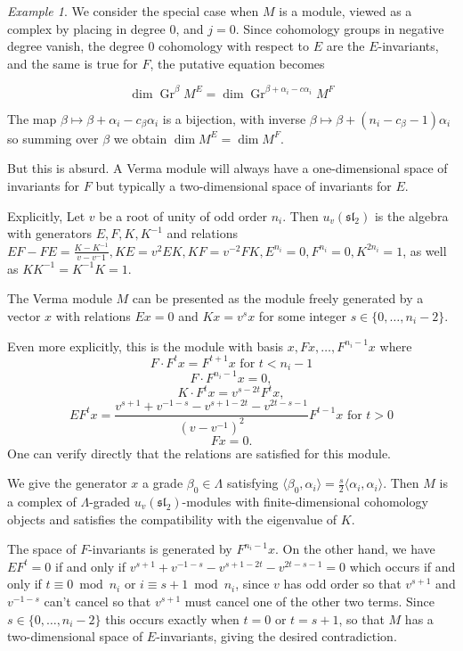 \documentclass[11pt,letterpaper]{article}
\theoremstyle{definition}
\theoremstyle{remark}
\newtheorem{example}[theorem]{Example}
\numberwithin{equation}{section}
\theoremstyle{dotless}
\newcommand{\Gr}{\operatorname{Gr}}
\newcommand{\qv}{v}
\begin{document}
\begin{example}\label{counter-example} We consider the special case when $M$ is a module, viewed as a complex by placing in degree $0$, and $j=0$. Since cohomology groups in negative degree vanish,  the degree $0$ cohomology with respect to $E$ are the $E$-invariants, and the same is true for $F$, the putative equation becomes

 \[  \dim \Gr^\beta M^E   =   \dim \Gr^{\beta+ \alpha_i 
 - c\alpha_i  }M^F  \] 

The map $\beta \mapsto \beta + \alpha_i - c_\beta \alpha_i$ is a bijection, with inverse $\beta \mapsto \beta  + (n_i - c_\beta-1) \alpha_i$ so summing over $\beta$ we obtain $\dim M^E = \dim M^F$.

But this is absurd. A Verma module will always have a one-dimensional space of invariants for $F$ but typically a two-dimensional space of invariants for $E$.


Explicitly, Let $\qv$ be a root of unity of odd order $n_i$. Then $u_{\qv}(\mathfrak{sl}_2)$ is the algebra with generators $E, F, K, K^{-1} $ and relations $EF - FE = \frac{ K- K^{-1}}{\qv-\qv^-1} , KE = \qv^2 EK, KF= \qv^{-2} FK , E^{n_i} =0, F^{n_i}=0, K^{2n_i}=1$, as well as $K K^{-1} = K^{-1}K=1$.

The Verma module $M$ can be presented as the module freely generated by a vector $x$ with relations $E x =0 $ and $K x = \qv^s x$ for some integer $s \in \{0,\dots, n_i-2\}$.

Even more explicitly, this is the module with basis $x, Fx, \dots, F^{n_i-1} x$ where 
\[ F \cdot F^t x= F^{t+1}x \textrm{ for }t<n_i-1\] \[  F \cdot F^{n_i-1} x=0,\]  
\[K \cdot F^t x = \qv^{s-2t} F^t x,\]
\[ E F^t x = \frac{ \qv^{s+1} + \qv^{-1-s } - \qv^{s+1-2t }  - \qv^{ 2t-s-1}   }{ (\qv- \qv^{-1})^2}   F^{t-1} x   \textrm{ for } t>0\]
\[ F x=0.\]One can verify directly that the relations are satisfied for this module.

We give the generator $x$ a grade $\beta_0 \in \Lambda$ satisfying $\langle \beta_0 ,\alpha_i \rangle = \frac{s}{2} \langle \alpha_i, \alpha_i \rangle$.  Then $M$ is a complex of $\Lambda$-graded $u_{\qv}(\mathfrak{sl}_2)$-modules with finite-dimensional cohomology objects and satisfies the compatibility with the eigenvalue of $K$.

The space of $F$-invariants is generated by $F^{n_i-1} x$. On the other hand, we have $E F^t=0$ if and only if  $ \qv^{s+1} + \qv^{-1-s } - \qv^{s+1-2t }  - \qv^{ 2t-s-1} =0$ which occurs if and only if $t \equiv 0 \bmod n_i$ or $i \equiv s+1 \bmod n_i$, since $\qv$ has odd order so that $ \qv^{s+1} $ and $\qv^{-1-s }$ can't cancel so that $ \qv^{s+1} $ must cancel one of the other two terms.  Since $s \in \{0,\dots,n_i-2\}$ this occurs exactly when $t=0$ or $t=s+1$, so that $M$ has a two-dimensional space of $E$-invariants, giving the desired contradiction.


\end{example}
\end{document}
